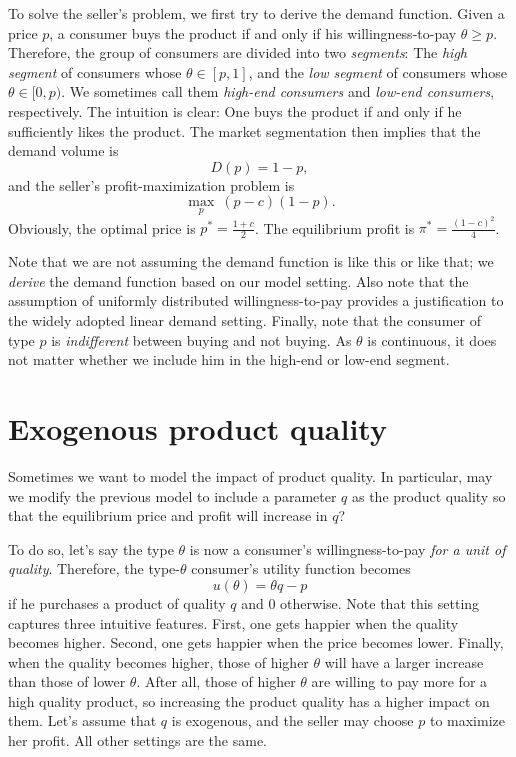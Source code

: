 \documentclass[11pt,a4paper]{article}
\begin{document}
To solve the seller's problem, we first try to derive the demand function.
Given a price $p$, a consumer buys the product if and only if his willingness-to-pay
$\theta \geq p$. Therefore, the group of consumers are divided into two
\textit{segments}: The \textit{high segment} of consumers
whose $\theta \in [p, 1]$, and the \textit{low segment} of consumers
whose $\theta \in [0, p)$. We sometimes call them \textit{high-end consumers}
and \textit{low-end consumers}, respectively.
The intuition is clear: One buys the product if and
only if he sufficiently likes the product.
The market segmentation then implies that the demand volume is
\[
	D(p) = 1 - p,
\]
and the seller's profit-maximization problem is
\[
	\max_p \ (p - c)(1 - p).
\]
Obviously, the optimal price is $p^* = \frac{1 + c}{2}$.
The equilibrium profit is $\pi^* = \frac{(1 - c)^2}{4}$.

Note that we are not assuming the demand function is like this or like that;
we \textit{derive} the demand function based on our model setting.
Also note that the assumption of uniformly distributed willingness-to-pay
provides a justification to the widely adopted linear demand setting.
Finally, note that the consumer of type $p$ is \textit{indifferent} between
buying and not buying. As $\theta$ is continuous, it does not matter
whether we include him in the high-end or low-end segment.










\section{Exogenous product quality}

Sometimes we want to model the impact of product quality.
In particular, may we modify the previous model to include a parameter
$q$ as the product quality so that the equilibrium price and profit will
increase in $q$?

To do so, let's say the type $\theta$ is now a consumer's willingness-to-pay
\textit{for a unit of quality}. Therefore, the type-$\theta$ consumer's
utility function becomes
\[
	u(\theta) = \theta q - p
\]
if he purchases a product of quality $q$ and 0 otherwise.
Note that this setting captures
three intuitive features. First, one gets happier when the quality becomes higher.
Second, one gets happier when the price becomes lower.
Finally, when the quality becomes higher, those of higher $\theta$
will have a larger increase than those of lower $\theta$. After all,
those of higher $\theta$ are willing to pay more for a high quality product,
so increasing the product quality has a higher impact on them.
Let's assume that $q$ is exogenous, and the seller may choose $p$ to maximize
her profit. All other settings are the same.
\end{document}
